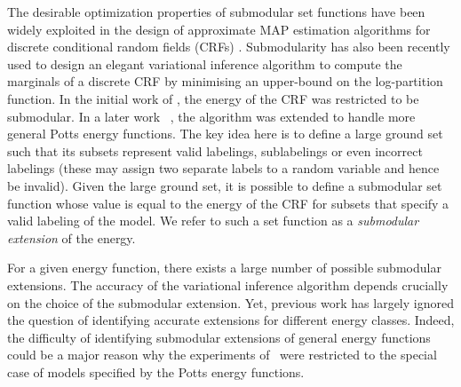 The desirable optimization properties of submodular set functions have been
widely exploited in the design of approximate MAP estimation algorithms for
discrete conditional random fields (CRFs) \citep{boykov2001fast,
kumar2011improved}. Submodularity has also been recently used to design an
elegant variational inference algorithm to compute the marginals of a discrete
CRF by minimising an upper-bound on the log-partition function. In the initial
work of \citep{djolonga2014map}, the energy of the CRF was restricted to be submodular. In a later work ~\citep{zhang2015higher}, the algorithm was extended to handle more general Potts energy functions. The key idea here is to define a large ground set such that its subsets represent valid labelings, sublabelings or even incorrect labelings (these may assign two separate labels to a random variable and hence be invalid). Given the large ground set, it is possible to define a submodular set function whose value is equal to the energy of the CRF for subsets that specify a valid labeling of the model. We refer to such a set function as a {\em submodular extension} of the energy. 

For a given energy function, there exists a large number of possible submodular extensions. The accuracy of the variational inference algorithm depends crucially on the choice of the submodular extension. Yet, previous work has largely ignored the question of identifying accurate extensions for different energy classes. Indeed, the difficulty of identifying submodular extensions of general energy functions could be a major reason why the experiments of~\citep{zhang2015higher} were restricted to the special case of models specified by the Potts energy functions.

